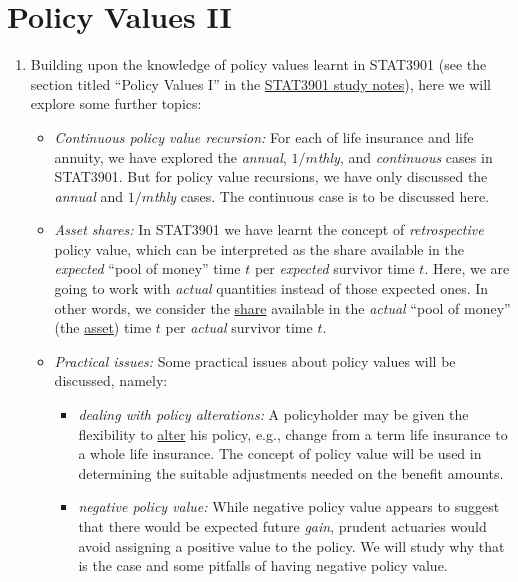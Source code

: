 \section{Policy Values II}
\label{sect:policy-values}
\begin{enumerate}
\item Building upon the knowledge of policy values learnt in STAT3901 (see the
section titled ``Policy Values I'' in the
\href{https://leochiukl.github.io/files/stat3901-study-notes.pdf}{STAT3901
study notes}), here we will explore some further topics:
\begin{itemize}
\item \emph{Continuous policy value recursion:} For each of life insurance and
life annuity, we have explored the \emph{annual}, \emph{\(1/m\)thly}, and
\emph{continuous} cases in STAT3901. But for policy value recursions, we have
only discussed the \emph{annual} and \emph{\(1/m\)thly} cases. The continuous
case is to be discussed here.

\item \emph{Asset shares:} In STAT3901 we have learnt the concept of
\emph{retrospective} policy value, which can be interpreted as the share
available in the \emph{expected} ``pool of money''  time \(t\) per
\emph{expected} survivor  time \(t\).  Here, we are going to work
with \emph{actual} quantities instead of those expected ones. In other words,
we consider the \underline{share} available in the \emph{actual} ``pool of
money'' (the \underline{asset})  time \(t\) per \emph{actual}
survivor  time \(t\).

\item \emph{Practical issues:} Some practical issues about policy values will
be discussed, namely:
\begin{itemize}
\item \emph{dealing with policy alterations:} A policyholder may be given the
flexibility to \underline{alter} his policy, e.g., change from a term life
insurance to a whole life insurance. The concept of policy value will be used
in determining the suitable adjustments needed on the benefit amounts.
\item \emph{negative policy value:} While negative policy value appears to
suggest that there would be expected future \emph{gain}, prudent actuaries
would avoid assigning a positive value to the policy. We will study why that is
the case and some pitfalls of having negative policy value.
\end{itemize}
\end{itemize}
\end{enumerate}
